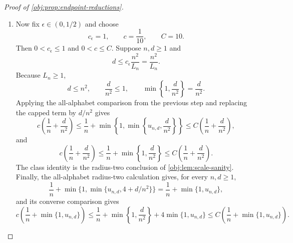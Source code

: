 \begin{proof}[Proof of \cref{obj:prop:endpoint-reductions}]
\begin{enumerate}
\item Now fix \(\epsilon\in(0,1/2)\) and choose
\[
c_\epsilon=1,
\qquad
c=\frac1{10},
\qquad
C=10 .
\]
Then \(0<c_\epsilon\le1\) and \(0<c\le C\).  Suppose \(n,d\ge1\) and
\[
d\le c_\epsilon\frac{n^2}{L_n}=\frac{n^2}{L_n}.
\]
Because \(L_n\ge1\),
\[
d\le n^2,
\qquad
\frac d{n^2}\le1,
\qquad
\min\left\{1,\frac d{n^2}\right\}=\frac d{n^2}.
\]
Applying the all-alphabet comparison from the previous step and replacing the capped term by \(d/n^2\) gives
\[
c\left(\frac1n+\frac d{n^2}\right)
\le
\frac1n+\min\left\{1,\min\left\{u_{n,d},\frac d{n^2}\right\}\right\}
\le
C\left(\frac1n+\frac d{n^2}\right),
\]
and
\[
c\left(\frac1n+\frac d{n^2}\right)
\le
\frac1n+\min\left\{1,\frac d{n^2}\right\}
\le
C\left(\frac1n+\frac d{n^2}\right).
\]
The class identity is the radius-two conclusion of \cref{obj:lem:scale-sanity}.  Finally, the all-alphabet radius-two calculation gives, for every \(n,d\ge1\),
\[
\frac1n+\min\{1,\min\{u_{n,d},4+d/n^2\}\}
=
\frac1n+\min\{1,u_{n,d}\},
\]
and its converse comparison gives
\[
c\left(\frac1n+\min\{1,u_{n,d}\}\right)
\le
\frac1n+\min\left\{1,\frac d{n^2}\right\}+4\min\{1,u_{n,d}\}
\le
C\left(\frac1n+\min\{1,u_{n,d}\}\right).
\]
\end{enumerate}
\end{proof}

